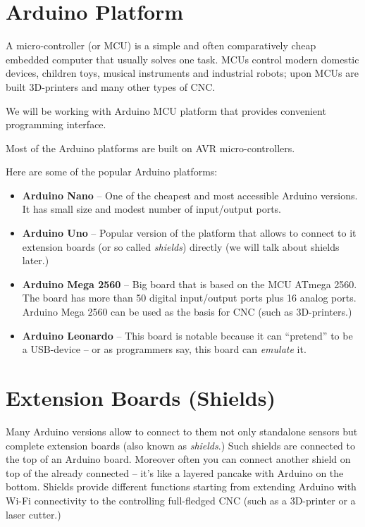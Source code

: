\documentclass[../sparc.tex]{subfiles}
\begin{document}
\section{Arduino Platform}


A micro-controller (or \gls{MCU}) is a simple and often comparatively cheap
embedded computer that usually solves one task.  MCUs control modern domestic
devices, children toys, musical instruments and industrial robots; upon MCUs are
built 3D-printers and many other types of \gls{CNC}.

We will be working with Arduino MCU platform that provides convenient
programming interface.

Most of the Arduino platforms are built on AVR micro-controllers.

Here are some of the popular Arduino platforms:
\begin{itemize}
\item \textbf{Arduino Nano} -- One of the cheapest and most accessible Arduino
  versions. It has small size and modest number of input/output ports.
\item \textbf{Arduino Uno} -- Popular version of the platform that allows to
  connect to it extension boards (or so called \emph{shields}) directly (we will
  talk about shields later.)
\item \textbf{Arduino Mega 2560} -- Big board that is based on the MCU ATmega
  2560.  The board has more than 50 digital input/output ports plus 16 analog
  ports.  Arduino Mega 2560 can be used as the basis for CNC (such as
  3D-printers.)
\item \textbf{Arduino Leonardo} -- This board is notable because it can
  ``pretend'' to be a USB-device -- or as programmers say, this board can
  \emph{emulate} it.
\end{itemize}

\section{Extension Boards (Shields)}

Many Arduino versions allow to connect to them not only standalone sensors but
complete extension boards (also known as \emph{shields}.)  Such shields are
connected to the top of an Arduino board.  Moreover often you can connect
another shield on top of the already connected -- it's like a layered pancake
with Arduino on the bottom.  Shields provide different functions starting from
extending Arduino with Wi-Fi connectivity to the controlling full-fledged
\gls{CNC} (such as a 3D-printer or a laser cutter.)
\end{document}
